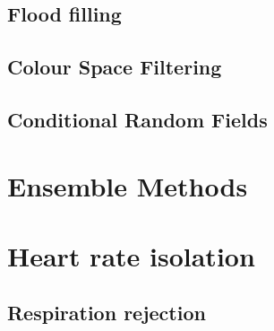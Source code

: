 \subsection{Flood filling}
\subsection{Colour Space Filtering}
\subsection{Conditional Random Fields}

\section{Ensemble Methods}

\section{Heart rate isolation}
\subsection{Respiration rejection}

\section{}